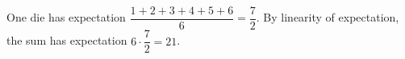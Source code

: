 One die has expectation $\dfrac{1+2+3+4+5+6}{6}=\dfrac{7}{2}$. By linearity of expectation, the sum has expectation $6\cdot\dfrac{7}{2}=\boxed{21}$.
